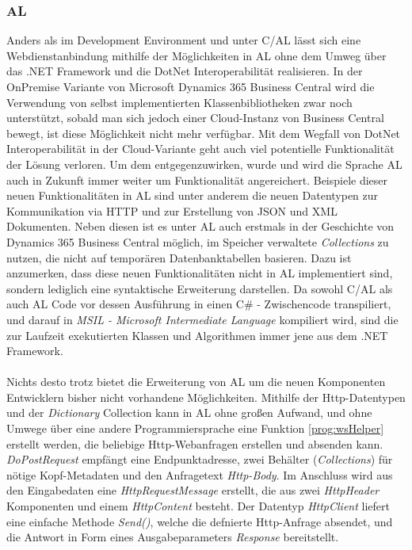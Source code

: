 \subsubsection{AL}
Anders als im Development Environment und unter C/AL lässt sich eine Webdienstanbindung mithilfe der Möglichkeiten in AL ohne dem Umweg über das .NET Framework und die DotNet Interoperabilität realisieren. In der OnPremise Variante von Microsoft Dynamics 365 Business Central wird die Verwendung von selbst implementierten Klassenbibliotheken zwar noch unterstützt, sobald man sich jedoch einer Cloud-Instanz von Business Central bewegt, ist diese Möglichkeit nicht mehr verfügbar. Mit dem Wegfall von DotNet Interoperabilität in der Cloud-Variante geht auch viel potentielle Funktionalität der Lösung verloren. Um dem entgegenzuwirken, wurde und wird die Sprache AL auch in Zukunft immer weiter um Funktionalität angereichert. Beispiele dieser neuen Funktionalitäten in AL sind unter anderem die neuen Datentypen zur Kommunikation via HTTP und zur Erstellung von JSON und XML Dokumenten. Neben diesen ist es unter AL auch erstmals in der Geschichte von Dynamics 365 Business Central möglich, im Speicher verwaltete \textit{Collections} zu nutzen, die nicht auf temporären Datenbanktabellen basieren. Dazu ist anzumerken, dass diese neuen Funktionalitäten nicht in AL implementiert sind, sondern lediglich eine syntaktische Erweiterung darstellen. Da sowohl C/AL als auch AL Code vor dessen Ausführung in einen C\# - Zwischencode transpiliert, und darauf in \textit{MSIL - Microsoft Intermediate Language} kompiliert wird, sind die zur Laufzeit exekutierten Klassen und Algorithmen immer jene aus dem .NET Framework. \linebreak

\paragraph{}
Nichts desto trotz bietet die Erweiterung von AL um die neuen Komponenten Entwicklern bisher nicht vorhandene Möglichkeiten. Mithilfe der Http-Datentypen und der \textit{Dictionary} Collection kann in AL ohne großen Aufwand, und ohne Umwege über eine andere Programmiersprache eine Funktion \ref{prog:wsHelper} erstellt werden, die beliebige Http-Webanfragen erstellen und absenden kann. \textit{DoPostRequest} empfängt eine Endpunktadresse, zwei Behälter (\textit{Collections}) für nötige Kopf-Metadaten und den Anfragetext \textit{Http-Body}. Im Anschluss wird aus den Eingabedaten eine \textit{HttpRequestMessage} erstellt, die aus zwei \textit{HttpHeader} Komponenten und einem \textit{HttpContent} besteht. Der Datentyp \textit{HttpClient} liefert eine einfache Methode \textit{Send()}, welche die defnierte Http-Anfrage absendet, und die Antwort in Form eines Ausgabeparameters \textit{Response} bereitstellt.

